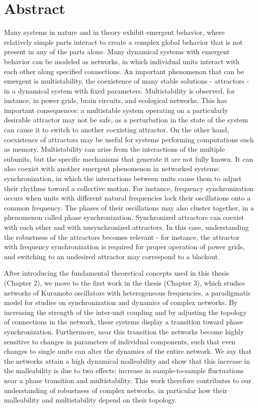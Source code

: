 \section*{Abstract}

Many systems in nature and in theory exhibit emergent behavior, where relatively simple parts interact to create a complex global behavior that is not present in any of the parts alone. Many dynamical systems with emergent behavior can be modeled as networks, in which individual units interact with each other along specified connections. An important phenomenon that can be emergent is multistability, the coexistence of many stable solutions - attractors - in a dynamical system with fixed parameters. Multistability is observed, for instance, in power grids, brain circuits, and ecological networks. This has important consequences: a multistable system operating on a particularly desirable attractor may not be safe, as a perturbation in the state of the system can cause it to switch to another coexisting attractor. On the other hand, coexistence of attractors may be useful for systems performing computations such as memory. Multistability can arise from the interactions of the multiple subunits, but the specific mechanisms that generate it are not fully known. It can also coexist with another emergent phenomenon in networked systems: synchronization, in which the interactions between units cause them to adjust their rhythms toward a collective motion. For instance, frequency synchronization occurs when units with different natural frequencies lock their oscillations onto a common frequency. The phases of their oscillations may also cluster together, in a phenomenon called phase synchronization.  Synchronized attractors can coexist with each other and with unsynchronized attractors. In this case, understanding the robustness of the attractors becomes relevant - for instance, the attractor with frequency synchronization is required for proper operation of power grids, and switching to an undesired attractor may correspond to a blackout. 

After introducing the fundamental theoretical concepts used in this thesis (Chapter 2), we move to the first work in the thesis (Chapter 3), which studies networks of Kuramoto oscillators with heterogeneous frequencies, a paradigmatic model for studies on synchronization and dynamics of complex networks. By increasing the strength of the inter-unit coupling and by adjusting the topology of connections in the network, these systems display a transition toward phase synchronization. Furthermore, near this transition the networks become highly sensitive to changes in parameters of individual components, such that even changes to single units can alter the dynamics of the entire network. We say that the networks attain a high dynamical malleability and show that this increase in the malleability is due to two effects: increase in sample-to-sample fluctuations near a phase transition and multistability. This work therefore contributes to our understanding of robustness of complex networks, in particular how their malleability and multistability depend on their topology. 

